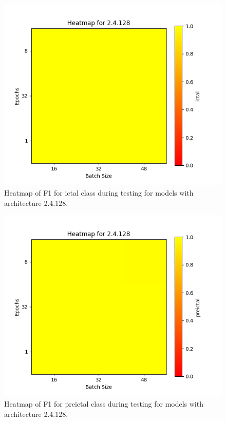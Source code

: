 \documentclass[12pt]{article}
\begin{document}
\begin{figure}[H]
\includegraphics[width=\textwidth]{heatmap_f1_ictal_2.4.128}
\centering
\caption{Heatmap of F1 for ictal class during testing for models with architecture 2.4.128.}
\label{fig:time-metrics}
\end{figure}

\begin{figure}[H]
\includegraphics[width=\textwidth]{heatmap_f1_preictal_2.4.128}
\centering
\caption{Heatmap of F1 for preictal class during testing for models with architecture 2.4.128.}
\label{fig:time-metrics}
\end{figure}
\end{document}
